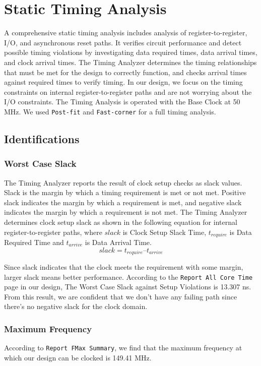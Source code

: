 \documentclass[letterpaper, 12pt]{article} %
\begin{document}
\section{Static Timing Analysis}
A comprehensive static timing analysis includes analysis of register-to-register, I/O, and asynchronous reset paths. It verifies circuit performance and detect possible timing violations by investigating data required times, data arrival times, and clock arrival times. The Timing Analyzer determines the timing relationships that must be met for the design to correctly function, and checks arrival times against required times to verify timing. 
In our design, we focus on the timing constraints on internal register-to-register paths and are not worrying about the I/O constraints. The Timing Analysis is operated with the Base Clock at 50 MHz. We used \texttt{Post-fit} and \texttt{Fast-corner} for a full timing analysis. 

\subsection{Identifications}
\subsubsection{Worst Case Slack}
The Timing Analyzer reports the result of clock setup checks as slack values. Slack is the margin by which a timing requirement is met or not met. Positive slack indicates the margin by which a requirement is met, and negative slack indicates the margin by which a requirement is not met. The Timing Analyzer determines clock setup slack as shown in the following equation for internal register-to-register paths, where $slack$ is Clock Setup Slack Time, $t_{require}$ is Data Required Time and $t_{arrive}$ is Data Arrival Time.
\begin{equation}
slack = t_{require} – t_{arrive}
\end{equation}

\noindent Since slack indicates that the clock meets the requirement with some margin, larger slack means better performance. According to the \texttt{Report All Core Time} page in our design, The Worst Case Slack against Setup Violations is 13.307 ns. 
From this result, we are confident that we don't have any failing path since there's no negative slack for the clock domain. 
\subsubsection{Maximum Frequency}
According to \texttt{Report FMax Summary}, we find that the maximum frequency at which our design can be clocked is 149.41 MHz. 
\end{document}
